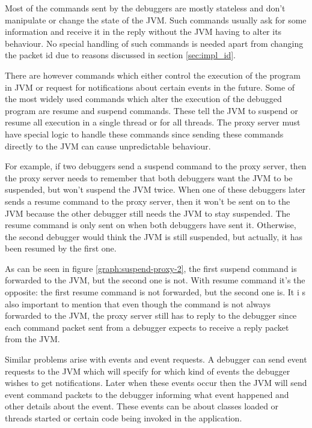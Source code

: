 \documentclass[..thesis.tex]{subfiles}
\begin{document}
Most of the commands sent by the debuggers are mostly stateless and don't manipulate or change the state of the JVM.
Such commands usually ask for some information and receive it in the reply without the JVM having to alter its behaviour.
No special handling of such commands is needed apart from changing the packet id due to reasons discussed in section \ref{sec:impl_id}.

There are however commands which either control the execution of the program in JVM or request for notifications about certain events in the future.
Some of the most widely used commands which alter the execution of the debugged program are resume and suspend commands.
These tell the JVM to suspend or resume all execution in a single thread or for all threads.
The proxy server must have special logic to handle these commands since sending these commands directly to the JVM can cause unpredictable behaviour.

For example, if two debuggers send a suspend command to the proxy server, then the proxy server needs to remember that both debuggers want the JVM to be suspended, but won't suspend the JVM twice.
When one of these debuggers later sends a resume command to the proxy server, then it won't be sent on to the JVM because the other debugger still needs the JVM to stay suspended.
The resume command is only sent on when both debuggers have sent it.
Otherwise, the second debugger would think the JVM is still suspended, but actually, it has been resumed by the first one.



As can be seen in figure \ref{graph:suspend-proxy-2}, the first suspend command is forwarded to the JVM, but the second one is not. 
With resume command it's the opposite: the first resume command is not forwarded, but the second one is.
It i s also important to mention that even though the command is not always forwarded to the JVM, the proxy server still has to reply to the debugger since each command packet sent from a debugger expects to receive a reply packet from the JVM.

Similar problems arise with events and event requests.
A debugger can send event requests to the JVM which will specify for which kind of events the debugger wishes to get notifications.
Later when these events occur then the JVM will send event command packets to the debugger informing what event happened and other details about the event.
These events can be about classes loaded or threads started or certain code being invoked in the application.
\end{document}
